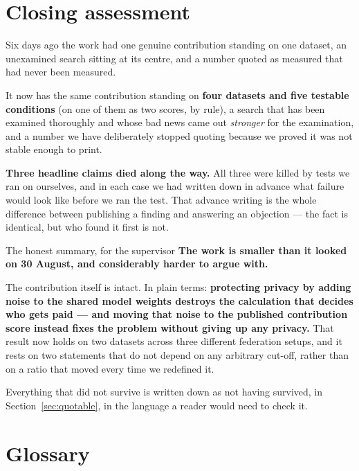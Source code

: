 \documentclass[11pt]{article}
\begin{document}
\section{Closing assessment}

Six days ago the work had one genuine contribution standing on one dataset, an unexamined search sitting
at its centre, and a number quoted as measured that had never been measured.

It now has the same contribution standing on \textbf{four datasets and five testable conditions} (on one
of them as two scores, by rule), a search that
has been examined thoroughly and whose bad news came out \emph{stronger} for the examination, and a
number we have deliberately stopped quoting because we proved it was not stable enough to print.

\textbf{Three headline claims died along the way.} All three were killed by tests we ran on ourselves,
and in each case we had written down in advance what failure would look like before we ran the test.
That advance writing is the whole difference between publishing a finding and answering an objection ---
the fact is identical, but who found it first is not.

\begin{keybox}{The honest summary, for the supervisor}
\textbf{The work is smaller than it looked on 30 August, and considerably harder to argue with.}

The contribution itself is intact. In plain terms: \textbf{protecting privacy by adding noise to the
shared model weights destroys the calculation that decides who gets paid --- and moving that noise to
the published contribution score instead fixes the problem without giving up any privacy.} That result
now holds on two datasets across three different federation setups, and it rests on two statements that
do not depend on any arbitrary cut-off, rather than on a ratio that moved every time we redefined it.

Everything that did not survive is written down as not having survived, in Section~\ref{sec:quotable},
in the language a reader would need to check it.
\end{keybox}

\clearpage
\appendix
\section{Glossary}
\end{document}
